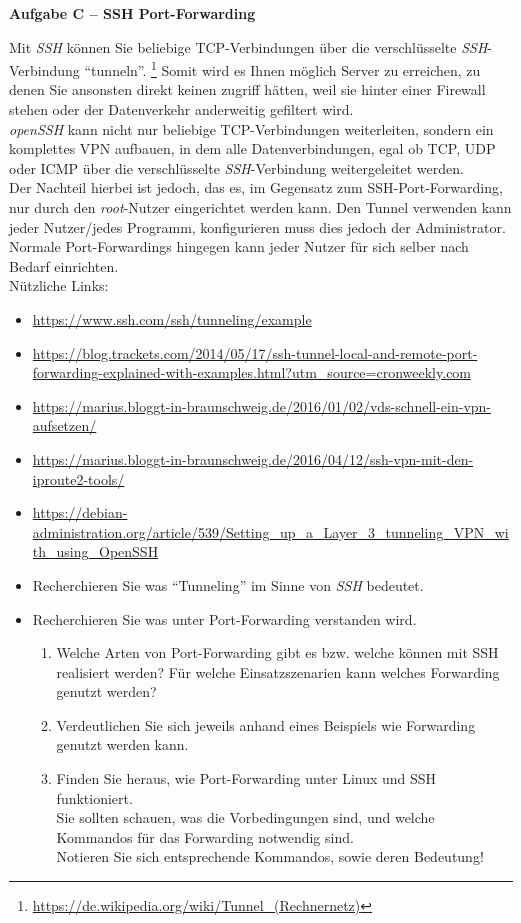 \documentclass[paper=a4,fontsize=11pt]{scrartcl}%
\begin{document}
\begin{center}\Large{\textbf{Aufgabe C -- SSH Port-Forwarding}}\end{center}\vskip0.25in
Mit \emph{SSH} können Sie beliebige TCP-Verbindungen über die verschlüsselte \emph{SSH}-Verbindung \enquote{tunneln}. \footnote{\url{https://de.wikipedia.org/wiki/Tunnel_(Rechnernetz)}} Somit wird es Ihnen möglich Server zu erreichen, zu denen Sie ansonsten direkt keinen zugriff hätten, weil sie hinter einer Firewall stehen oder der Datenverkehr anderweitig gefiltert wird.\\
\emph{openSSH} kann nicht nur beliebige TCP-Verbindungen weiterleiten, sondern ein komplettes VPN aufbauen, in dem alle Datenverbindungen, egal ob TCP, UDP oder ICMP über die verschlüsselte \emph{SSH}-Verbindung weitergeleitet werden.\\
Der Nachteil hierbei ist jedoch, das es, im Gegensatz zum SSH-Port-Forwarding, nur durch den \emph{root}-Nutzer eingerichtet werden kann. Den Tunnel verwenden kann jeder Nutzer/jedes Programm, konfigurieren muss dies jedoch der Administrator. Normale Port-Forwardings hingegen kann jeder Nutzer für sich selber nach Bedarf einrichten.\\
Nützliche Links:
\begin{itemize}
	\item \url{https://www.ssh.com/ssh/tunneling/example}
	\item \url{https://blog.trackets.com/2014/05/17/ssh-tunnel-local-and-remote-port-forwarding-explained-with-examples.html?utm_source=cronweekly.com}
	\item \url{https://marius.bloggt-in-braunschweig.de/2016/01/02/vds-schnell-ein-vpn-aufsetzen/}
	\item \url{https://marius.bloggt-in-braunschweig.de/2016/04/12/ssh-vpn-mit-den-iproute2-tools/}
	\item \url{https://debian-administration.org/article/539/Setting_up_a_Layer_3_tunneling_VPN_with_using_OpenSSH}
\end{itemize}
\begin{itemize}
	\item Recherchieren Sie was \enquote{Tunneling} im Sinne von \emph{SSH}  bedeutet.
	\item Recherchieren Sie was unter Port-Forwarding verstanden wird.\\
	\begin{enumerate}
		\item Welche Arten von Port-Forwarding gibt es bzw. welche können mit SSH realisiert werden? Für welche Einsatzszenarien kann welches Forwarding genutzt werden?
		\item Verdeutlichen Sie sich jeweils anhand eines Beispiels wie Forwarding genutzt werden kann.
		\item Finden Sie heraus, wie Port-Forwarding unter Linux und SSH funktioniert.\\
		Sie sollten schauen, was die Vorbedingungen sind, und welche Kommandos für das Forwarding notwendig sind.\\
		Notieren Sie sich entsprechende Kommandos, sowie deren Bedeutung!
	\end{enumerate}
\end{itemize}
\end{document}
